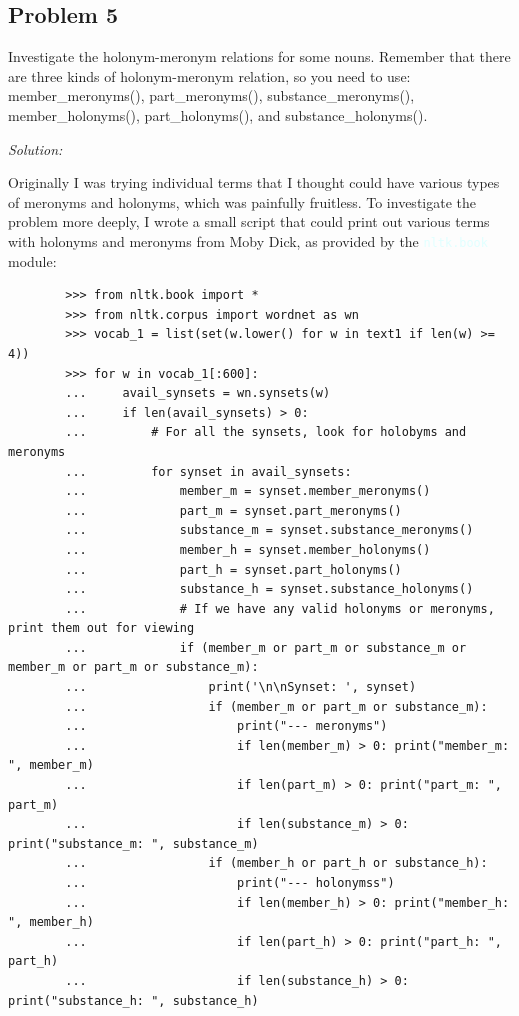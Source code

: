 \documentclass[11pt]{article}
\newenvironment{solution}{
	\vspace{10px}\noindent\emph{Solution:}
}{
	\vspace{10px}
}
\newcommand{\codeword}[1]{
	\texttt{\textcolor{lightCyan}{#1}}
}
\begin{document}
\subsection*{Problem 5}
Investigate the holonym-meronym relations for some nouns. Remember that there are three kinds of holonym-meronym relation, so you need to use: member\_meronyms(), part\_meronyms(),  substance\_meronyms(), member\_holonyms(), part\_holonyms(), and substance\_holonyms().

\begin{solution}
	
	Originally I was trying individual terms that I thought could have various types of meronyms and holonyms, which was painfully fruitless. To investigate the problem more deeply, I wrote a small script that could print out various terms with holonyms and meronyms from Moby Dick, as provided by the \codeword{nltk.book} module: 
	
	\begin{lstlisting}
		>>> from nltk.book import *
		>>> from nltk.corpus import wordnet as wn
		>>> vocab_1 = list(set(w.lower() for w in text1 if len(w) >= 4))
		>>> for w in vocab_1[:600]:
		...     avail_synsets = wn.synsets(w)
		...     if len(avail_synsets) > 0:
		...         # For all the synsets, look for holobyms and meronyms
		...         for synset in avail_synsets:
		...             member_m = synset.member_meronyms()
		...             part_m = synset.part_meronyms()
		...             substance_m = synset.substance_meronyms()
		...             member_h = synset.member_holonyms()
		...             part_h = synset.part_holonyms()
		...             substance_h = synset.substance_holonyms()
		...             # If we have any valid holonyms or meronyms, print them out for viewing
		...             if (member_m or part_m or substance_m or member_m or part_m or substance_m):
		...                 print('\n\nSynset: ', synset)
		...                 if (member_m or part_m or substance_m):
		...                     print("--- meronyms")
		...                     if len(member_m) > 0: print("member_m: ", member_m)
		...                     if len(part_m) > 0: print("part_m: ", part_m)
		...                     if len(substance_m) > 0: print("substance_m: ", substance_m)
		...                 if (member_h or part_h or substance_h):
		...                     print("--- holonymss")
		...                     if len(member_h) > 0: print("member_h: ", member_h)
		...                     if len(part_h) > 0: print("part_h: ", part_h)
		...                     if len(substance_h) > 0: print("substance_h: ", substance_h)
	\end{lstlisting}
	

\end{solution}
\end{document}
